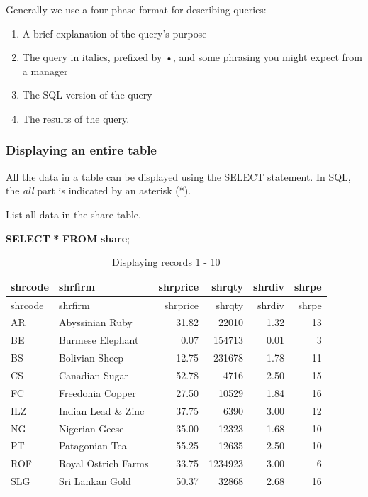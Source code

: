\documentclass[
]{article}
\newenvironment{Shaded}{\begin{snugshade}}{\end{snugshade}}
\newcommand{\KeywordTok}[1]{\textcolor[rgb]{0.13,0.29,0.53}{\textbf{#1}}}
\newcommand{\NormalTok}[1]{#1}
\newcommand{\OperatorTok}[1]{\textcolor[rgb]{0.81,0.36,0.00}{\textbf{#1}}}
\begin{document}
Generally we use a four-phase format for describing queries:

\begin{enumerate}
\def\labelenumi{\arabic{enumi}.}
\item
  A brief explanation of the query's purpose
\item
  The query in italics, prefixed by •, and some phrasing you might
  expect from a manager
\item
  The SQL version of the query
\item
  The results of the query.
\end{enumerate}

\hypertarget{displaying-an-entire-table}{%
\subsubsection{Displaying an entire
table}\label{displaying-an-entire-table}}

All the data in a table can be displayed using the SELECT statement. In
SQL, the \emph{all} part is indicated by an asterisk (*).

List all data in the share table.

\begin{Shaded}
\begin{Highlighting}[]
\KeywordTok{SELECT} \OperatorTok{*} \KeywordTok{FROM} \KeywordTok{share}\NormalTok{;}
\end{Highlighting}
\end{Shaded}

\begin{longtable}[]{@{}llrrrr@{}}
\caption{Displaying records 1 - 10}\tabularnewline
\toprule()
shrcode & shrfirm & shrprice & shrqty & shrdiv & shrpe \\
\midrule()
\endfirsthead
\toprule()
shrcode & shrfirm & shrprice & shrqty & shrdiv & shrpe \\
\midrule()
\endhead
AR & Abyssinian Ruby & 31.82 & 22010 & 1.32 & 13 \\
BE & Burmese Elephant & 0.07 & 154713 & 0.01 & 3 \\
BS & Bolivian Sheep & 12.75 & 231678 & 1.78 & 11 \\
CS & Canadian Sugar & 52.78 & 4716 & 2.50 & 15 \\
FC & Freedonia Copper & 27.50 & 10529 & 1.84 & 16 \\
ILZ & Indian Lead \& Zinc & 37.75 & 6390 & 3.00 & 12 \\
NG & Nigerian Geese & 35.00 & 12323 & 1.68 & 10 \\
PT & Patagonian Tea & 55.25 & 12635 & 2.50 & 10 \\
ROF & Royal Ostrich Farms & 33.75 & 1234923 & 3.00 & 6 \\
SLG & Sri Lankan Gold & 50.37 & 32868 & 2.68 & 16 \\
\bottomrule()
\end{longtable}
\end{document}
